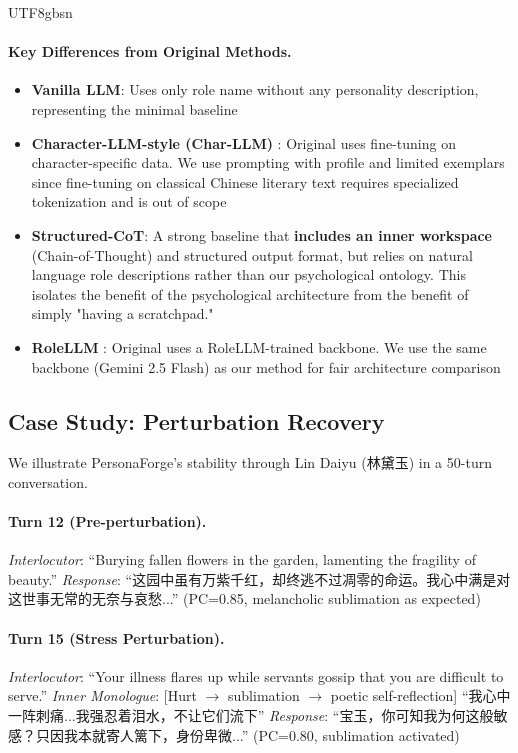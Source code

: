 \documentclass[11pt]{article}
\begin{document}
\begin{CJK*}{UTF8}{gbsn}
\paragraph{Key Differences from Original Methods.}
\begin{itemize}
    \item \textbf{Vanilla LLM}: Uses only role name without any personality description, representing the minimal baseline
    \item \textbf{Character-LLM-style (Char-LLM)} \citep{shao2023character}: Original uses fine-tuning on character-specific data. We use prompting with profile and limited exemplars since fine-tuning on classical Chinese literary text requires specialized tokenization and is out of scope
    \item \textbf{Structured-CoT}: A strong baseline that \textbf{includes an inner workspace} (Chain-of-Thought) and structured output format, but relies on natural language role descriptions rather than our psychological ontology. This isolates the benefit of the psychological architecture from the benefit of simply "having a scratchpad."
    \item \textbf{RoleLLM} \citep{wang2024rolellm}: Original uses a RoleLLM-trained backbone. We use the same backbone (Gemini 2.5 Flash) as our method for fair architecture comparison
\end{itemize}


\subsection{Case Study: Perturbation Recovery}
\label{sec:case}

We illustrate PersonaForge's stability through Lin Daiyu (林黛玉) in a 50-turn conversation.

\paragraph{Turn 12 (Pre-perturbation).}
\textit{Interlocutor}: ``Burying fallen flowers in the garden, lamenting the fragility of beauty.''
\textit{Response}: ``这园中虽有万紫千红，却终逃不过凋零的命运。我心中满是对这世事无常的无奈与哀愁...'' (PC=0.85, melancholic sublimation as expected)

\paragraph{Turn 15 (Stress Perturbation).}
\textit{Interlocutor}: ``Your illness flares up while servants gossip that you are difficult to serve.''
\textit{Inner Monologue}: [Hurt $\rightarrow$ sublimation $\rightarrow$ poetic self-reflection] ``我心中一阵刺痛...我强忍着泪水，不让它们流下''
\textit{Response}: ``宝玉，你可知我为何这般敏感？只因我本就寄人篱下，身份卑微...'' (PC=0.80, sublimation activated)


\end{CJK*}
\end{document}
